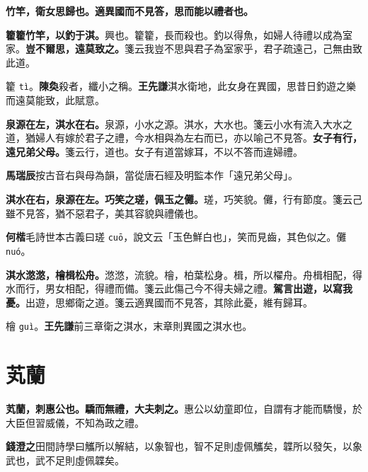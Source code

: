 
\textbf{竹竿，衛女思歸也。適異國而不見答，思而能以禮者也。}

\textbf{籊籊竹竿，以釣于淇。}{\footnotesize 興也。籊籊，長而殺也。釣以得魚，如婦人待禮以成為室家。}\textbf{豈不爾思，遠莫致之。}{\footnotesize 箋云我豈不思與君子為室家乎，君子疏遠己，己無由致此道。}

\begin{quoting}籊 \texttt{tì}。\textbf{陳奐}殺者，纖小之稱。\textbf{王先謙}淇水衛地，此女身在異國，思昔日釣遊之樂而遠莫能致，此賦意。\end{quoting}

\textbf{泉源在左，淇水在右。}{\footnotesize 泉源，小水之源。淇水，大水也。箋云小水有流入大水之道，猶婦人有嫁於君子之禮，今水相與為左右而已，亦以喻己不見答。}\textbf{女子有行，遠兄弟父母。}{\footnotesize 箋云行，道也。女子有道當嫁耳，不以不答而違婦禮。}

\begin{quoting}\textbf{馬瑞辰}按古音右與母為韻，當從唐石經及明監本作「遠兄弟父母」。\end{quoting}

\textbf{淇水在右，泉源在左。巧笑之瑳，佩玉之儺。}{\footnotesize 瑳，巧笑貌。儺，行有節度。箋云己雖不見答，猶不惡君子，美其容貌與禮儀也。}

\begin{quoting}\textbf{何楷}毛詩世本古義曰瑳 \texttt{cuō}，說文云「玉色鮮白也」，笑而見齒，其色似之。儺 \texttt{nuó}。\end{quoting}

\textbf{淇水滺滺，檜楫松舟。}{\footnotesize 滺滺，流貌。檜，柏葉松身。楫，所以櫂舟。舟楫相配，得水而行，男女相配，得禮而備。箋云此傷己今不得夫婦之禮。}\textbf{駕言出遊，以寫我憂。}{\footnotesize 出遊，思鄉衛之道。箋云適異國而不見答，其除此憂，維有歸耳。}

\begin{quoting}檜 \texttt{guì}。\textbf{王先謙}前三章衛之淇水，末章則異國之淇水也。\end{quoting}

\section{芄蘭}


\textbf{芄蘭，刺惠公也。驕而無禮，大夫刺之。}{\footnotesize 惠公以幼童即位，自謂有才能而驕慢，於大臣但習威儀，不知為政之禮。}

\begin{quoting}\textbf{錢澄之}田間詩學曰觿所以解結，以象智也，智不足則虛佩觿矣，韘所以發矢，以象武也，武不足則虛佩韘矣。\end{quoting}

